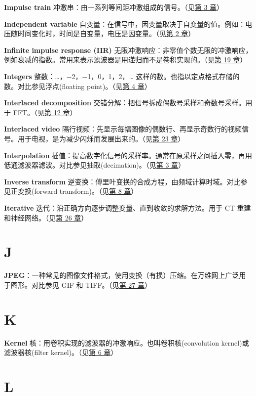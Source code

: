\textbf{Impulse train}
冲激串：由一系列等间距冲激组成的信号。（见\hyperref[ch-03]{第 3 章}）

\textbf{Independent variable}
自变量：在信号中，因变量取决于自变量的值。例如：电压随时间变化时，时间是自变量，电压是因变量。（见\hyperref[ch-02]{第
2 章}）

\textbf{Infinite impulse response (IIR)}
无限冲激响应：非零值个数无限的冲激响应，例如衰减的指数。常用来表示滤波器是用递归而不是卷积实现的。（见\hyperref[ch-19]{第
19 章}）

\textbf{Integers} 整数：\ldots，−2，−1，0，1，2，\ldots{}
这样的数。也指以定点格式存储的数。对比参见浮点(floating
point)。（见\hyperref[ch-04]{第 4 章}）

\textbf{Interlaced decomposition}
交错分解：把信号拆成偶数号采样和奇数号采样。用于
FFT。（见\hyperref[ch-12]{第 12 章}）

\textbf{Interlaced video}
隔行视频：先显示每幅图像的偶数行、再显示奇数行的视频信号。用于电视，是为减少闪烁而发展出来的。（见\hyperref[ch-23]{第
23 章}）

\textbf{Interpolation}
插值：提高数字化信号的采样率。通常在原采样之间插入零，再用低通滤波器滤波。对比参见抽取(decimation)。（见\hyperref[ch-03]{第
3 章}）

\textbf{Inverse transform}
逆变换：傅里叶变换的合成方程，由频域计算时域。对比参见正变换(forward
transform)。（见\hyperref[ch-08]{第 8 章}）

\textbf{Iterative}
迭代：沿正确方向逐步调整变量、直到收敛的求解方法。用于 CT
重建和神经网络。（见\hyperref[ch-26]{第 26 章}）

\section{J}

\textbf{JPEG}：一种常见的图像文件格式，使用变换（有损）压缩。在万维网上广泛用于图形。对比参见
GIF 和 TIFF。（见\hyperref[ch-27]{第 27 章}）

\section{K}

\textbf{Kernel} 核：用卷积实现的滤波器的冲激响应。也叫卷积核(convolution
kernel)或滤波器核(filter kernel)。（见\hyperref[ch-06]{第 6 章}）

\section{L}


